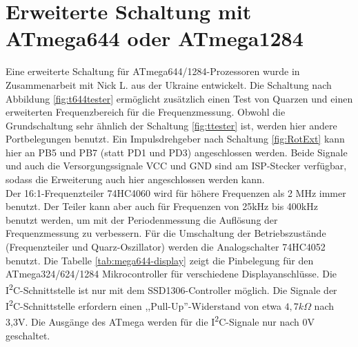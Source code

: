\section{Erweiterte Schaltung mit ATmega644 oder ATmega1284}

Eine erweiterte Schaltung für ATmega644/1284-Prozessoren wurde in Zusammenarbeit mit Nick L. aus
der Ukraine entwickelt. Die Schaltung nach Abbildung \ref{fig:t644tester} ermöglicht zusätzlich
einen Test von Quarzen und einen erweiterten Frequenzbereich für die Frequenzmessung.
Obwohl die Grundschaltung sehr ähnlich der Schaltung \ref{fig:ttester} ist, werden hier
andere Portbelegungen benutzt.
Ein Impulsdrehgeber nach Schaltung \ref{fig:RotExt} kann hier an PB5 und PB7 (statt PD1 und PD3) angeschlossen werden.
Beide Signale und auch die Versorgungssignale VCC und GND sind am ISP-Stecker verfügbar,
sodass die Erweiterung auch hier angeschlossen werden kann.\\

Der 16:1-Frequenzteiler 74HC4060 wird für höhere Frequenzen als 2 MHz immer benutzt.
Der Teiler kann aber auch für Frequenzen von 25kHz bis 400kHz benutzt werden, um mit der
Periodenmessung die Auflösung der Frequenzmessung zu verbessern.
Für die Umschaltung der Betriebszustände (Frequenzteiler und Quarz-Oszillator) werden
die Analogschalter 74HC4052 benutzt.
Die Tabelle \ref{tab:mega644-display} zeigt die Pinbelegung für den ATmega324/624/1284 Mikrocontroller für verschiedene Displayanschlüsse.
Die I\textsuperscript{2}C-Schnittstelle ist nur mit dem SSD1306-Controller möglich.
Die Signale der I\textsuperscript{2}C-Schnittstelle erfordern einen ,,Pull-Up''-Widerstand von etwa \(4,7k\Omega\) nach 3,3V.
Die Ausgänge des ATmega werden für die I\textsuperscript{2}C-Signale nur nach 0V geschaltet.


